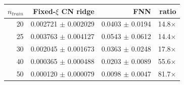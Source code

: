 \begin{tabular}{rrrr}
$n_{train}$ & Fixed-$\xi$ CN ridge & FNN & ratio \\
\hline
20 & 0.002721 $\pm$ 0.002029 & 0.0403 $\pm$ 0.0194 & 14.8$\times$ \\
25 & 0.003763 $\pm$ 0.004127 & 0.0543 $\pm$ 0.0612 & 14.4$\times$ \\
30 & 0.002045 $\pm$ 0.001673 & 0.0363 $\pm$ 0.0248 & 17.8$\times$ \\
40 & 0.000365 $\pm$ 0.000488 & 0.0203 $\pm$ 0.0089 & 55.6$\times$ \\
50 & 0.000120 $\pm$ 0.000079 & 0.0098 $\pm$ 0.0047 & 81.7$\times$ \\
\end{tabular}
